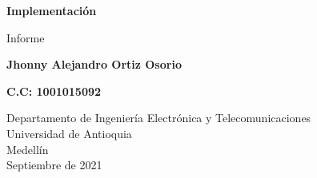\documentclass{article}
\begin{document}
\begin{titlepage}
    \begin{center}
        \vspace*{1cm} 
            
        \Huge
        \textbf{Implementación}
            
        \vspace{0.5cm}
        \LARGE
        Informe 
            
        \vspace{1.5cm}
            
        \textbf{Jhonny Alejandro Ortiz Osorio}
        
        \textbf{C.C: 1001015092}
        
        \vfill
            
        \vspace{0.8cm}
            
        \Large
        Departamento de Ingeniería Electrónica y Telecomunicaciones\\
        Universidad de Antioquia\\
        Medellín\\
        Septiembre de 2021
            
    \end{center}
\end{titlepage}

\tableofcontents
\newpage
\end{document}

